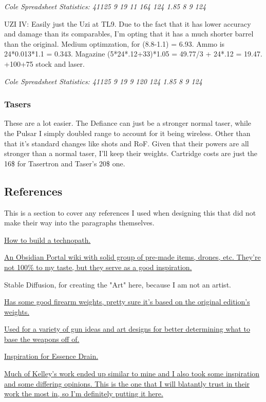 \begin{multicols*}{2}
	\textit{\textcolor{OliveGreen}{Cole Spreadsheet Statistics: 41125 9 19 11 164 124 1.85 8 9 124}}
	
	UZI IV: Easily just the Uzi at TL9. Due to the fact that it has lower accuracy and damage than its comparables, I'm opting that it has a much shorter barrel than the original. Medium optimzation, for (8.8-1.1) = 6.93. Ammo is 24*0.013*1.1 = 0.343. Magazine (5*24*.12+33)*1.05 = 49.77/3 + 24*.12 = 19.47. +100+75 stock and laser.
	
	\textit{\textcolor{OliveGreen}{Cole Spreadsheet Statistics: 41125 9 19 9 120 124 1.85 8 9 124}}
	
	\subsubsection{Tasers}
	
	These are a lot easier. The Defiance can just be a stronger normal taser, while the Pulsar I simply doubled range to account for it being wireless. Other than that it's standard changes like shots and RoF. Given that their powers are all stronger than a normal taser, I'll keep their weights. Cartridge costs are just the 16\$ for Tasertron and Taser's 20\$ one.
	
	\subsection{References}
	
	This is a section to cover any references I used when designing this that did not make their way into the paragraphs themselves.
	
	\href{https://www.ravensnpennies.com/gurps101-how-to-build-a-technopath/}{How to build a technopath.}
	
	\href{https://gurps-sr.obsidianportal.com}{An Obsidian Portal wiki with solid group of pre-made items, drones, etc. They're not 100\% to my taste, but they serve as a good inspiration.}
	
	Stable Diffusion, for creating the "Art" here, because I am not an artist.
	
	\href{http://www.ci-n.com/~jcampbel/rpgs/shadowrun/weapons.php?altskills}{Has some good firearm weights, pretty sure it's based on the original edition's weights.}
	
	\href{http://www.ambient.ca/cpunk/shadowguns/subguns.html}{Used for a variety of gun ideas and art designs for better determining what to base the weapons off of.}
	
	\href{http://forums.sjgames.com/showthread.php?t=152300}{Inspiration for Essence Drain.}
	
	\href{http://forums.sjgames.com/showpost.php?p=507199&postcount=8}{Much of Kelley's work ended up similar to mine and I also took some inspiration and some differing opinions. This is the one that I will blatantly trust in their work the most in, so I'm definitely putting it here.}
	
\end{multicols*}